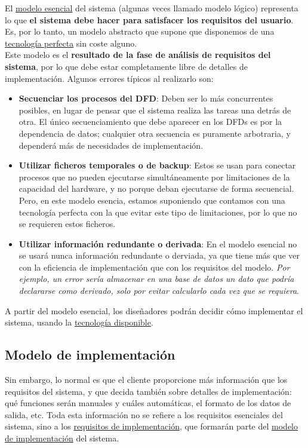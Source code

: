 El \uline{modelo esencial} del sistema (algunas veces llamado modelo lógico) representa lo que \textbf{el sistema debe hacer para satisfacer los requisitos del usuario}. Es, por lo tanto, un modelo abstracto que supone que disponemos de una \uline{tecnología perfecta} sin coste alguno.\\

Este modelo es el \textbf{resultado de la fase de análisis de requisitos del sistema}, por lo que debe estar completamente libre de detalles de implementación. Algunos errores típicos al realizarlo son:

\begin{itemize}
    \item \textbf{Secuenciar los procesos del DFD}: Deben ser lo más concurrentes posibles, en lugar de pensar que el sistema realiza las tareas una detrás de otra. El único secuenciamiento que debe aparecer en los DFDs es por la dependencia de datos; cualquier otra secuencia es puramente arbotraria, y dependerá más de necesidades de implementación.
    \item \textbf{Utilizar ficheros temporales o de backup}: Estos se usan para conectar procesos que no pueden ejecutarse simultáneamente por limitaciones de la capacidad del hardware, y no porque deban ejecutarse de forma secuencial. Pero, en este modelo esencia, estamos suponiendo que contamos con una tecnología perfecta con la que evitar este tipo de limitaciones, por lo que no se requieren estos ficheros.
    \item \textbf{Utilizar información redundante o derivada}: En el modelo esencial no se usará nunca información redundante o derviada, ya que tiene más que ver con la eficiencia de implementación que con los requisitos del modelo. \textit{Por ejemplo, un error sería almacenar en una base de datos un dato que podría declararse como derivado, solo por evitar calcularlo cada vez que se requiera}.
\end{itemize}

A partir del modelo esencial, los diseñadores podrán decidir cómo implementar el sistema, usando la \uline{tecnología disponible}.

\subsection{Modelo de implementación}

Sin embargo, lo normal es que el cliente proporcione más información que los requisitos del sistema, y que decida también sobre detalles de implementación: qué funciones serán manuales y cuáles automáticas, el formato de los datos de salida, etc. Toda esta información no se refiere a los requisitos esenciales del sistema, sino a los \uline{requisitos de implementación}, que formarán parte del \uline{modelo de implementación} del sistema.\\

